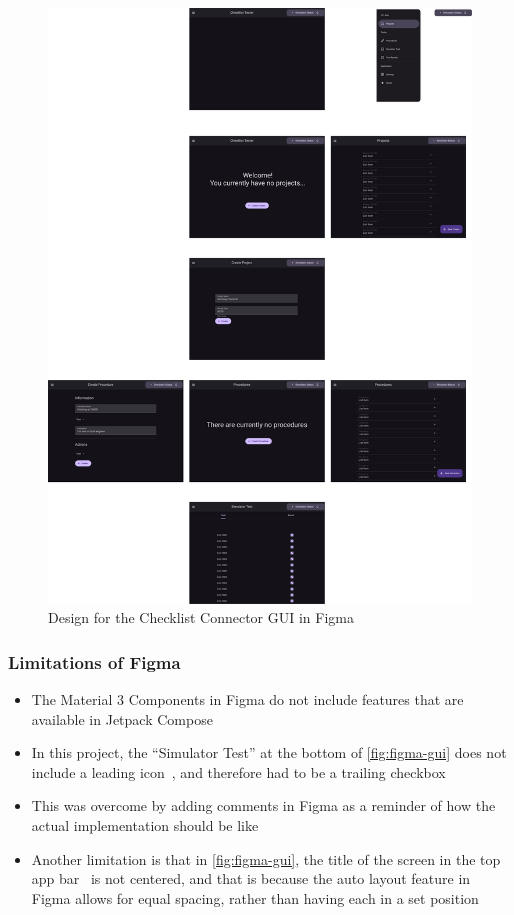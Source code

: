 \documentclass[../dissertation.tex]{subfiles}
\begin{document}
\begin{figure}
  \centering
  \includegraphics[width=\columnwidth]{images/figma-gui.pdf}
  \caption[GUI in Figma]{Design for the Checklist Connector GUI in Figma}
  \label{fig:figma-gui}
\end{figure}

\subsubsection{Limitations of Figma}
\begin{itemize}
  \item The Material 3 Components in Figma do not include features that are available in
    Jetpack Compose
  \item In this project, the \enquote{Simulator Test} at the bottom of \autoref{fig:figma-gui}
    does not include a leading icon~\cite{material:lists}, and therefore had to be a trailing
    checkbox
  \item This was overcome by adding comments in Figma as a reminder of how the actual implementation
    should be like
  \item Another limitation is that in \autoref{fig:figma-gui}, the title of the screen in the
    top app bar~\cite{material:top-app-bar} is not centered, and that is because the auto layout
    feature in Figma allows for equal spacing, rather than having each in a set position
\end{itemize}
\end{document}

